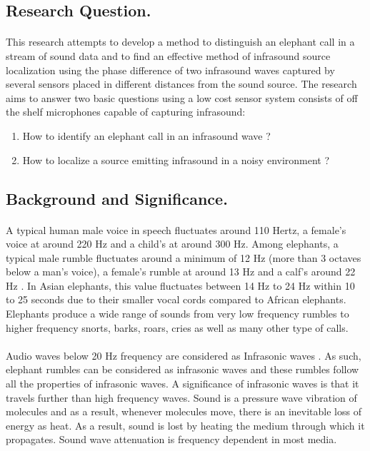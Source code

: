 \documentclass[12pt]{article}
\numberwithin{figure}{section}
\numberwithin{table}{section}
\begin{document}
\subsection{Research Question.} 
\paragraph{}
This research attempts to develop a method to distinguish an elephant call in a stream of sound data and to find an effective method of infrasound source localization using the phase difference of two infrasound waves captured by several sensors placed in different distances from the sound source. The research aims to answer two basic questions using a low cost sensor system consists of off the shelf microphones capable of capturing infrasound:

\begin{enumerate}
\item How to identify an elephant call in an infrasound wave ? 
\item How to  localize a source emitting infrasound in a noisy environment ?
\end{enumerate}


\subsection{Background and Significance.} 

\paragraph{}
A typical human male voice in speech fluctuates around 110 Hertz, a female's voice at around 220 Hz and a child's at around 300 Hz. Among elephants, a typical male rumble fluctuates around a minimum of 12 Hz (more than 3 octaves below a man's voice), a female's rumble at around 13 Hz and a calf's around 22 Hz \cite {1} \cite {2}. In Asian elephants, this value fluctuates between 14 Hz to 24 Hz within 10 to 25 seconds \cite {3} due to their smaller vocal cords compared to African elephants.  Elephants produce a wide range  of sounds from very low frequency rumbles to higher frequency snorts, barks, roars, cries as well as many other type of  calls. 

\paragraph{}
Audio waves below 20 Hz frequency are considered as Infrasonic waves \cite {4}. As such, elephant rumbles can be considered as infrasonic waves and these rumbles follow all the properties of infrasonic waves. A significance of infrasonic waves is that it travels further than high frequency waves. Sound is a pressure wave vibration of molecules and as a result, whenever molecules move, there is an inevitable loss of energy as heat. As a result, sound is lost by heating the medium through which it propagates. Sound wave attenuation is frequency dependent in most media.
\end{document}
